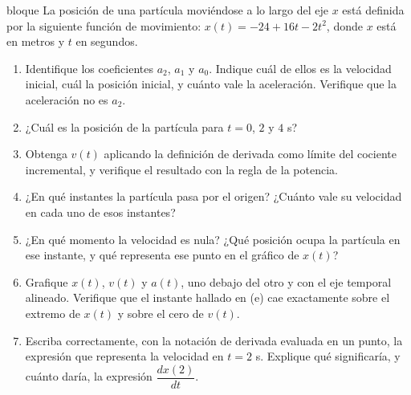 \documentclass[11pt,openany]{book}
\begin{document}
\begin{ejercicio}{bloque}
La posición de una partícula moviéndose a lo largo del eje $x$ está definida por la siguiente función de movimiento: $x(t) = -24 + 16t - 2t^2$, donde $x$ está en metros y $t$ en segundos.
\begin{enumerate}[label=(\alph*), leftmargin=1.7em, itemsep=1pt, topsep=3pt]
  \item Identifique los coeficientes $a_2$, $a_1$ y $a_0$. Indique cuál de ellos es la velocidad inicial, cuál la posición inicial, y cuánto vale la aceleración. Verifique que la aceleración no es $a_2$.
  \item ¿Cuál es la posición de la partícula para $t = 0$, $2$ y $4$ s?
  \item Obtenga $v(t)$ aplicando la definición de derivada como límite del cociente incremental, y verifique el resultado con la regla de la potencia.
  \item ¿En qué instantes la partícula pasa por el origen? ¿Cuánto vale su velocidad en cada uno de esos instantes?
  \item ¿En qué momento la velocidad es nula? ¿Qué posición ocupa la partícula en ese instante, y qué representa ese punto en el gráfico de $x(t)$?
  \item Grafique $x(t)$, $v(t)$ y $a(t)$, uno debajo del otro y con el eje temporal alineado. Verifique que el instante hallado en (e) cae exactamente sobre el extremo de $x(t)$ y sobre el cero de $v(t)$.
  \item Escriba correctamente, con la notación de derivada evaluada en un punto, la expresión que representa la velocidad en $t = 2$ s. Explique qué significaría, y cuánto daría, la expresión $\dfrac{dx(2)}{dt}$.
\end{enumerate}
\end{ejercicio}
\end{document}
